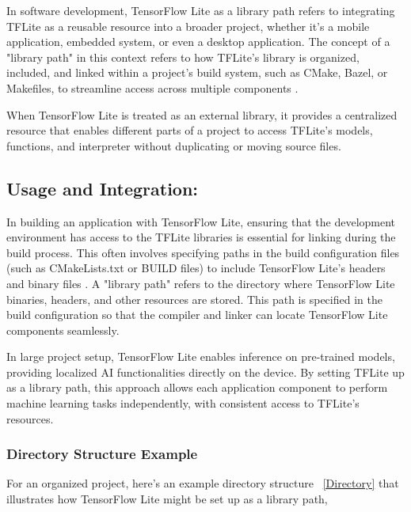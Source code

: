 In software development, TensorFlow Lite as a library path refers to integrating TFLite as a reusable resource into a broader project, whether it's a mobile application, embedded system, or even a desktop application. The concept of a "library path" in this context refers to how TFLite’s library is organized, included, and linked within a project's build system, such as CMake, Bazel, or Makefiles, to streamline access across multiple components \cite{tensorflowlitemicro:2024}.

When TensorFlow Lite is treated as an external library, it provides a centralized resource that enables different parts of a project to access TFLite's models, functions, and interpreter without duplicating or moving source files. 

\subsection{Usage and Integration:}

In building an application with TensorFlow Lite, ensuring that the development environment has access to the TFLite libraries is essential for linking during the build process. This often involves specifying paths in the build configuration files (such as CMakeLists.txt or BUILD files) to include TensorFlow Lite's headers and binary files \cite{Google_TFLite_ARM:2024}. A "library path" refers to the directory where TensorFlow Lite binaries, headers, and other resources are stored. This path is specified in the build configuration so that the compiler and linker can locate TensorFlow Lite components seamlessly.

In large project setup, TensorFlow Lite enables inference on pre-trained models, providing localized AI functionalities directly on the device. By setting TFLite up as a library path, this approach allows each application component to perform machine learning tasks independently, with consistent access to TFLite’s resources.

\subsubsection{Directory Structure Example}
For an organized project, here’s an example directory structure ~\ref{Directory} that illustrates how TensorFlow Lite might be set up as a library path,

